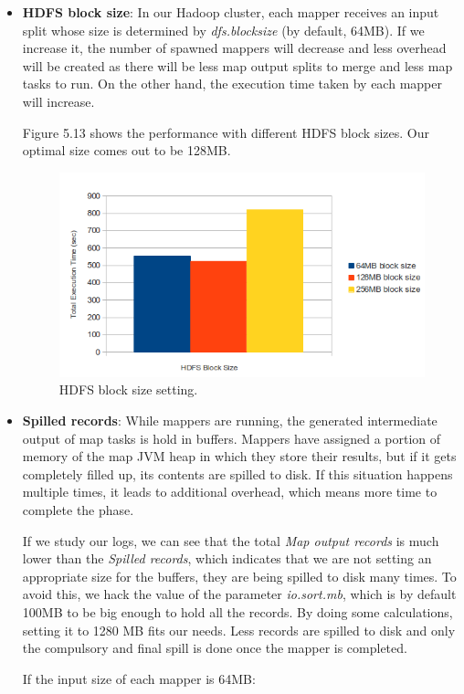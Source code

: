 \begin{itemize}
\item \textbf{HDFS block size}: In our Hadoop cluster, each mapper receives an input split whose size is determined by \textit{dfs.blocksize} (by default, 64MB). If we increase it, the number of spawned mappers will decrease and less overhead will be created as there will be less map output splits to merge and less map tasks to run. On the other hand, the execution time taken by each mapper will increase. 
\par
Figure 5.13 shows the performance with different HDFS block sizes. Our optimal size comes out to be 128MB.

\begin{figure}[htb]
\centering
\hspace*{0.21in}
\includegraphics[width=1\textwidth]{./images/HDFSBlockSize.png}
\caption{HDFS block size setting.} \label{fig:HDFSBlockSize}
\end{figure}




\item \textbf{Spilled records}: While mappers are running, the generated intermediate output of map tasks is hold in buffers. Mappers have assigned a portion of memory of the map JVM heap in which they store their results, but if it gets completely filled up, its contents are spilled to disk. If this situation happens multiple times, it leads to additional overhead, which means more time to complete the phase. 
\par
If we study our logs, we can see that the total \textit{Map output records} is much lower than the \textit{Spilled records}, which indicates that we are not setting an appropriate size for the buffers, they are being spilled to disk many times. To avoid this, we hack the value of the parameter \textit{io.sort.mb}, which is by default 100MB to be big enough to hold all the records. By doing some calculations, setting it to 1280 MB fits our needs. Less records are spilled to disk and only the compulsory and final spill is done once the mapper is completed.
\par
If the input size of each mapper is 64MB:
\bigskip


\end{itemize}
